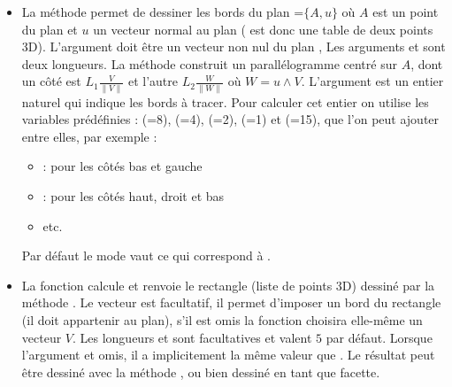 \begin{itemize}
    \item La méthode  permet de dessiner les bords du plan =$\{A,u\}$ où $A$ est un point du plan et $u$ un vecteur normal au plan ( est donc une table de deux points 3D). L'argument  doit être un vecteur non nul du plan , Les arguments  et  sont deux longueurs. La méthode construit un parallélogramme centré sur $A$, dont un côté est $L_1\frac{V}{\|V\|}$ et l'autre $L_2\frac{W}{\|W\|}$ où $W = u\wedge V$. L'argument  est un entier naturel qui indique les bords à tracer. Pour calculer cet entier on utilise les variables prédéfinies :  (=8),  (=4),  (=2),  (=1) et  (=15), que l'on peut ajouter entre elles, par exemple :
    \begin{itemize}
        \item {} : pour les côtés bas et gauche
        \item {} : pour les côtés haut, droit et bas
        \item etc.
    \end{itemize}
    Par défaut le mode vaut  ce qui correspond à .

    \item La fonction  calcule et renvoie le rectangle (liste de points 3D) dessiné par la méthode . Le vecteur  est facultatif, il permet d'imposer un bord du rectangle (il doit appartenir au plan), s'il est omis la fonction choisira elle-même un vecteur $V$. Les longueurs  et  sont facultatives et valent $5$ par défaut. Lorsque l'argument  et omis, il a implicitement la même valeur que . Le résultat peut être dessiné avec la méthode , ou bien dessiné en tant que facette.
\end{itemize}

